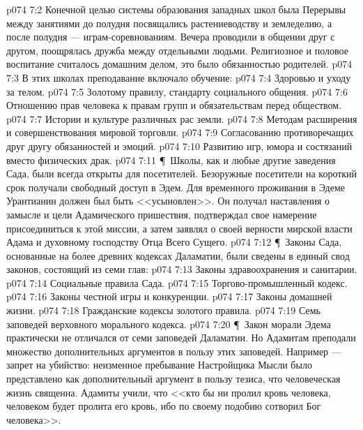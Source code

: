 \vs p074 7:2 Конечной целью системы образования западных школ была  Перерывы между занятиями до полудня посвящались растениеводству и земледелию, а после полудня --- играм\hyp{}соревнованиям. Вечера проводили в общении друг с другом, поощрялась дружба между отдельными людьми. Религиозное и половое воспитание считалось домашним делом, это было обязанностью родителей.
\vs p074 7:3 В этих школах преподавание включало обучение:
\vs p074 7:4 \bibnobreakspace Здоровью и уходу за телом.
\vs p074 7:5 \bibnobreakspace Золотому правилу, стандарту социального общения.
\vs p074 7:6 \bibnobreakspace Отношению прав человека к правам групп и обязательствам перед обществом.
\vs p074 7:7 \bibnobreakspace Истории и культуре различных рас земли.
\vs p074 7:8 \bibnobreakspace Методам расширения и совершенствования мировой торговли.
\vs p074 7:9 \bibnobreakspace Согласованию противоречащих друг другу обязанностей и эмоций.
\vs p074 7:10 \bibnobreakspace Развитию игр, юмора и состязаний вместо физических драк.
\vs p074 7:11 \P\ Школы, как и любые другие заведения Сада, были всегда открыты для посетителей. Безоружные посетители на короткий срок получали свободный доступ в Эдем. Для временного проживания в Эдеме Урантианин должен был быть <<усыновлен>>. Он получал наставления о замысле и цели Адамического пришествия, подтверждал свое намерение присоединиться к этой миссии, а затем заявлял о своей верности мирской власти Адама и духовному господству Отца Всего Сущего.
\vs p074 7:12 \P\ Законы Сада, основанные на более древних кодексах Даламатии, были сведены в единый свод законов, состоящий из семи глав:
\vs p074 7:13 \bibnobreakspace Законы здравоохранения и санитарии.
\vs p074 7:14 \bibnobreakspace Социальные правила Сада.
\vs p074 7:15 \bibnobreakspace Торгово\hyp{}промышленный кодекс.
\vs p074 7:16 \bibnobreakspace Законы честной игры и конкуренции.
\vs p074 7:17 \bibnobreakspace Законы домашней жизни.
\vs p074 7:18 \bibnobreakspace Гражданские кодексы золотого правила.
\vs p074 7:19 \bibnobreakspace Семь заповедей верховного морального кодекса.
\vs p074 7:20 \P\ Закон морали Эдема практически не отличался от семи заповедей Даламатии. Но Адамитам преподали множество дополнительных аргументов в пользу этих заповедей. Например --- запрет на убийство: неизменное пребывание Настройщика Мысли было представлено как дополнительный аргумент в пользу тезиса, что человеческая жизнь священна. Адамиты учили, что <<кто бы ни пролил кровь человека, человеком будет пролита его кровь, ибо по своему подобию сотворил Бог человека>>.
